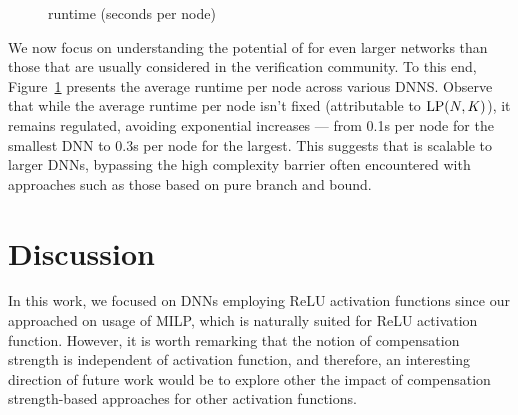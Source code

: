 \begin{figure}[b!]
	\centering
	\caption{runtime (seconds per node)}
	\label{fig2}
\end{figure}



We now focus on understanding the potential of {\toolname} for even larger networks than those that are usually considered in the verification community. To this end, Figure~\ref{fig2} presents the  average runtime per node across various DNNS. Observe that while  the average runtime per node isn't fixed (attributable to ${\textrm{LP}}(N,K)$), it remains regulated, avoiding exponential increases — from 0.1s per node for the smallest DNN to 0.3s per node for the largest. This suggests that {\toolname} is scalable to larger DNNs, bypassing the high complexity barrier often encountered with approaches such as those based on pure branch and bound.

\fi


\section{Discussion}
\label{Discussion}


In this work, we focused on DNNs employing ReLU activation functions since our approached on usage of MILP, which is naturally suited for ReLU activation function. However, it is worth remarking that the notion of compensation strength is independent of  activation function, and therefore, an interesting direction of future work would be to explore other the impact of compensation strength-based approaches for other activation functions. 


